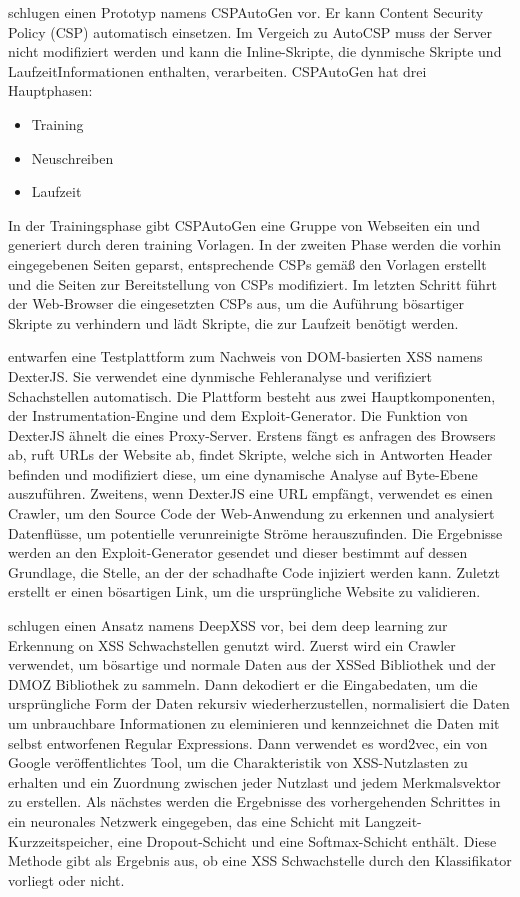 \textcite[653]{pan2016} schlugen einen Prototyp namens CSPAutoGen vor. Er kann Content Security Policy (CSP) automatisch einsetzen. Im Vergeich zu AutoCSP muss der Server nicht modifiziert werden und kann die Inline-Skripte, die dynmische Skripte und LaufzeitInformationen enthalten, verarbeiten. CSPAutoGen hat drei Hauptphasen:
\begin{itemize}
	\item Training
	\item Neuschreiben
	\item Laufzeit
\end{itemize}
In der Trainingsphase gibt CSPAutoGen eine Gruppe von Webseiten ein und generiert durch deren training Vorlagen. In der zweiten Phase werden die vorhin eingegebenen Seiten geparst, entsprechende CSPs gemäß den Vorlagen erstellt und die Seiten zur Bereitstellung von CSPs modifiziert. Im letzten Schritt führt der Web-Browser die eingesetzten CSPs aus, um die Auführung bösartiger Skripte zu verhindern und lädt Skripte, die zur Laufzeit benötigt werden.


\textcite{parameshwaran2015} entwarfen eine Testplattform zum Nachweis von DOM-basierten XSS namens DexterJS. Sie verwendet eine dynmische Fehleranalyse und verifiziert Schachstellen automatisch. Die Plattform besteht aus zwei Hauptkomponenten, der Instrumentation-Engine und dem Exploit-Generator. Die Funktion von DexterJS ähnelt die eines Proxy-Server. Erstens fängt es anfragen des Browsers ab, ruft URLs der Website ab, findet Skripte, welche sich in Antworten Header befinden und modifiziert diese, um eine dynamische Analyse auf Byte-Ebene auszuführen. Zweitens, wenn DexterJS eine URL empfängt, verwendet es einen Crawler, um den Source Code der Web-Anwendung zu erkennen und analysiert Datenflüsse, um potentielle verunreinigte Ströme herauszufinden. Die Ergebnisse werden an den Exploit-Generator gesendet und dieser bestimmt auf dessen Grundlage, die Stelle, an der der schadhafte Code injiziert werden kann. Zuletzt erstellt er einen bösartigen Link, um die ursprüngliche Website zu validieren.

\textcite[a49]{fang2018} schlugen einen Ansatz namens DeepXSS vor, bei dem deep learning zur Erkennung on XSS Schwachstellen genutzt wird. Zuerst wird ein Crawler verwendet, um bösartige und normale Daten aus der XSSed Bibliothek und der DMOZ Bibliothek zu sammeln. Dann dekodiert er die Eingabedaten, um die ursprüngliche Form der Daten rekursiv wiederherzustellen, normalisiert die Daten um unbrauchbare Informationen zu eleminieren und kennzeichnet die Daten mit selbst entworfenen Regular Expressions. Dann verwendet es word2vec, ein von Google veröffentlichtes Tool, um die Charakteristik von XSS-Nutzlasten zu erhalten und ein Zuordnung zwischen jeder Nutzlast und jedem Merkmalsvektor zu erstellen. Als nächstes werden die Ergebnisse des vorhergehenden Schrittes in ein neuronales Netzwerk eingegeben, das eine Schicht mit Langzeit-Kurzzeitspeicher, eine Dropout-Schicht und eine Softmax-Schicht enthält. Diese Methode gibt als Ergebnis aus, ob eine XSS Schwachstelle durch den Klassifikator vorliegt oder nicht.

